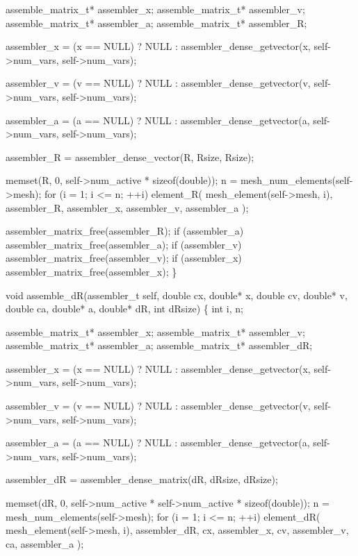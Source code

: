     assemble_matrix_t* assembler_x;
    assemble_matrix_t* assembler_v;
    assemble_matrix_t* assembler_a;
    assemble_matrix_t* assembler_R;

    assembler_x = (x == NULL) ? NULL : 
        assembler_dense_getvector(x, self->num_vars, self->num_vars);

    assembler_v = (v == NULL) ? NULL : 
        assembler_dense_getvector(v, self->num_vars, self->num_vars);

    assembler_a = (a == NULL) ? NULL : 
        assembler_dense_getvector(a, self->num_vars, self->num_vars);

    assembler_R = 
        assembler_dense_vector(R, Rsize, Rsize);

    memset(R, 0, self->num_active * sizeof(double));
    n = mesh_num_elements(self->mesh);
    for (i = 1; i <= n; ++i)
        element_R( mesh_element(self->mesh, i), assembler_R, 
                   assembler_x, assembler_v, assembler_a );

    assembler_matrix_free(assembler_R);
    if (assembler_a) assembler_matrix_free(assembler_a);
    if (assembler_v) assembler_matrix_free(assembler_v);
    if (assembler_x) assembler_matrix_free(assembler_x);
\}

\nwendcode{}\nwdocspar

\nwenddocs{}\plusendmoddef
void assemble_dR(assembler_t self, 
                 double cx, double* x, 
                 double cv, double* v, 
                 double ca, double* a, 
                 double* dR,
                 int dRsize)
\{
    int i, n;

    assemble_matrix_t* assembler_x;
    assemble_matrix_t* assembler_v;
    assemble_matrix_t* assembler_a;
    assemble_matrix_t* assembler_dR;

    assembler_x = (x == NULL) ? NULL : 
        assembler_dense_getvector(x, self->num_vars, self->num_vars);

    assembler_v = (v == NULL) ? NULL : 
        assembler_dense_getvector(v, self->num_vars, self->num_vars);

    assembler_a = (a == NULL) ? NULL : 
        assembler_dense_getvector(a, self->num_vars, self->num_vars);

    assembler_dR = 
        assembler_dense_matrix(dR, dRsize, dRsize);

    memset(dR, 0, self->num_active * self->num_active * sizeof(double));
    n = mesh_num_elements(self->mesh);
    for (i = 1; i <= n; ++i)
        element_dR( mesh_element(self->mesh, i), assembler_dR, 
                    cx, assembler_x,
                    cv, assembler_v,
                    ca, assembler_a );

